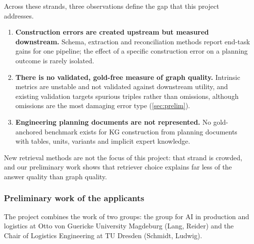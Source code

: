 Across these strands, three observations define the gap that this project addresses.
\begin{enumerate}[label=(\roman*), leftmargin=*, itemsep=1pt]
  \item \textbf{Construction errors are created upstream but measured downstream.} Schema, extraction and reconciliation methods report end-task gains for one pipeline; the effect of a specific construction error on a planning outcome is rarely isolated.
  \item \textbf{There is no validated, gold-free measure of graph quality.} Intrinsic metrics are unstable and not validated against downstream utility, and existing validation targets spurious triples rather than omissions, although omissions are the most damaging error type (\autoref{sec:prelim}).
  \item \textbf{Engineering planning documents are not represented.} No gold-anchored benchmark exists for \ac{KG} construction from planning documents with tables, units, variants and implicit expert knowledge.
\end{enumerate}
New retrieval methods are not the focus of this project: that strand is crowded, and our preliminary work shows that retriever choice explains far less of the answer quality than graph quality.

\subsubsection{Preliminary work of the applicants}\label{sec:prelim}

The project combines the work of two groups: the group for AI in production and logistics at Otto von Guericke University Magdeburg (Lang, Reider) and the Chair of Logistics Engineering at TU Dresden (Schmidt, Ludwig). 

